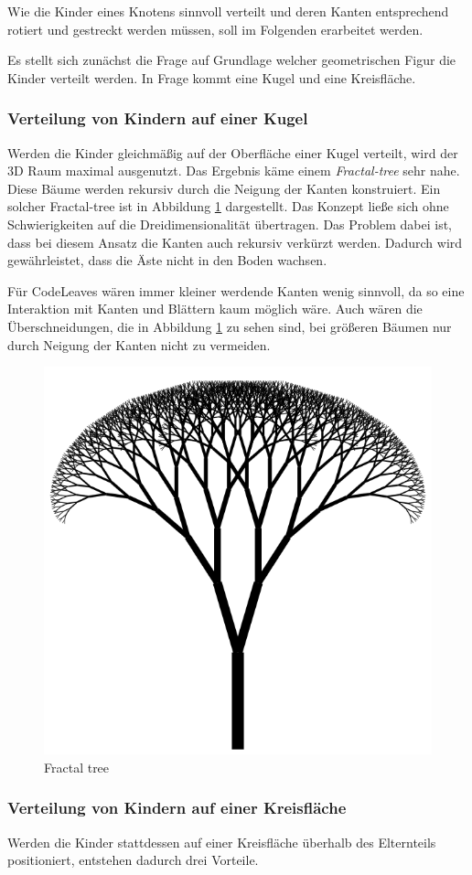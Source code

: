 Wie die Kinder eines Knotens sinnvoll verteilt und deren Kanten entsprechend rotiert und gestreckt werden müssen, soll im Folgenden erarbeitet werden.

Es stellt sich zunächst die Frage auf Grundlage welcher geometrischen Figur die Kinder verteilt werden. In Frage kommt eine Kugel und eine Kreisfläche.

\subsubsection*{Verteilung von Kindern auf einer Kugel}
Werden die Kinder gleichmäßig auf der Oberfläche einer Kugel verteilt, wird der 3D Raum maximal ausgenutzt. Das Ergebnis käme einem \textit{Fractal-tree} sehr nahe. Diese Bäume werden rekursiv durch die Neigung der Kanten konstruiert. Ein solcher Fractal-tree ist in Abbildung \ref{fig:fractal-tree} dargestellt. Das Konzept ließe sich ohne Schwierigkeiten auf die Dreidimensionalität übertragen. Das Problem dabei ist, dass bei diesem Ansatz die Kanten auch rekursiv verkürzt werden. Dadurch wird gewährleistet, dass die Äste nicht in den Boden wachsen.

Für CodeLeaves wären immer kleiner werdende Kanten wenig sinnvoll, da so eine Interaktion mit Kanten und Blättern kaum möglich wäre. Auch wären die Überschneidungen, die in Abbildung \ref{fig:fractal-tree} zu sehen sind, bei größeren Bäumen nur durch Neigung der Kanten nicht zu vermeiden.

\begin{figure}[htb]
  \includegraphics[width=.5\textwidth]{figures/fractal-tree}
  \caption{Fractal tree \cite{rocchini2017fractal}}
  \label{fig:fractal-tree}
\end{figure}

\subsubsection*{Verteilung von Kindern auf einer Kreisfläche}
Werden die Kinder stattdessen auf einer Kreisfläche überhalb des Elternteils positioniert, entstehen dadurch drei Vorteile.

